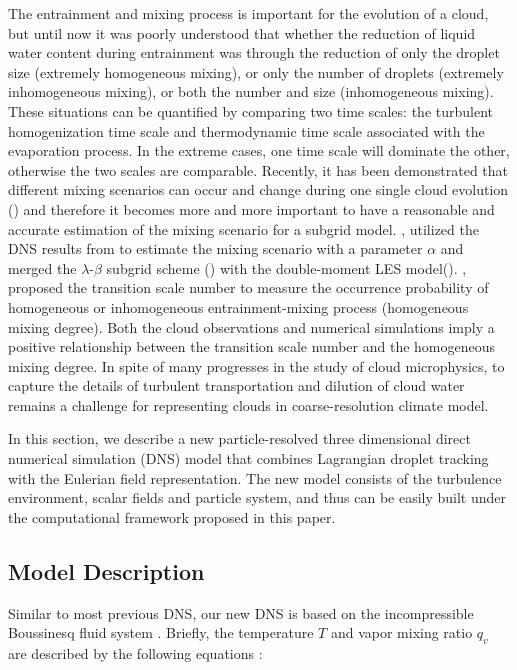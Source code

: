 The entrainment and mixing process is important for the evolution of a cloud, but until now it was poorly understood that whether the reduction of liquid water content during entrainment was through the reduction of only the droplet size (extremely homogeneous mixing), or only the number of droplets (extremely inhomogeneous mixing), or both the number and size (inhomogeneous mixing). These situations can be quantified by comparing two time scales: the turbulent homogenization time scale and thermodynamic time scale associated with the evaporation process. In the extreme cases, one time scale will dominate the other, otherwise the two scales are comparable. Recently, it has been demonstrated that different mixing scenarios can occur and change during one single cloud evolution (\cite{Andrejczuk2009,Burnet2007Observational,Lehmann2009}) and therefore it becomes more and more important to have a reasonable and accurate estimation of the mixing scenario for a subgrid model. \cite{Jarecka2013}, utilized the DNS results from \cite{Andrejczuk2004, Andrejczuk2006, Andrejczuk2009}  to estimate the mixing scenario with a parameter $\alpha$ and merged the $\lambda$-$\beta$ subgrid scheme (\cite{Jarecka2009}) with the double-moment LES model(\cite{Morrison2008}). \cite{Lu2013}, proposed the transition scale number to measure the occurrence probability of homogeneous or inhomogeneous entrainment-mixing process (homogeneous mixing degree). Both the cloud observations and numerical simulations imply a positive relationship between the transition scale number and the homogeneous mixing degree. In spite of many progresses in the study of cloud microphysics, to capture the details of turbulent transportation and dilution of cloud water remains a challenge for representing clouds in coarse-resolution climate model.

In this section, we describe a new particle-resolved three dimensional direct numerical simulation (DNS) model that combines Lagrangian droplet tracking with the Eulerian field representation. The new model consists of the turbulence environment, scalar fields and particle system, and thus can be easily built under the computational framework proposed in this paper.

\subsection{Model Description}
Similar to most previous DNS, our new DNS is based on the incompressible
Boussinesq fluid system \cite{Andrejczuk2004}. Briefly, the temperature $T$ and vapor
mixing ratio $q_v$ are described by the following equations \cite{Kumar2012Cloud}:

